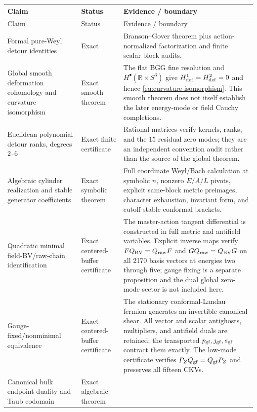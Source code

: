 \documentclass[11pt]{article}
\theoremstyle{definition}
\theoremstyle{remark}
\newcommand{\R}{\mathbb R}
\begin{document}
{\scriptsize
\begin{longtable}{>{\raggedright\arraybackslash}p{}
                >{\raggedright\arraybackslash}p{}
                >{\raggedright\arraybackslash}p{}}
\toprule
Claim & Status & Evidence / boundary\\
\midrule
\endfirsthead
\toprule
Claim & Status & Evidence / boundary\\
\midrule
\endhead
Formal pure-Weyl detour identities & Exact & Branson--Gover theorem plus
action-normalized factorization and finite scalar-block audits.\\
Global smooth deformation cohomology and curvature isomorphism & Exact
smooth theorem & The flat BGG fine resolution and
$H^\bullet(\R\times S^3)$ give $H^1_{\rm def}=H^2_{\rm def}=0$ and hence
\eqref{eq:curvature-isomorphism}.  This smooth theorem does not itself
establish the later energy-mode or field Cauchy completions.\\
Euclidean polynomial detour ranks, degrees $2$--$6$ & Exact finite
certificate & Rational matrices verify kernels, ranks, and the $15$ residual
zero modes; they are an independent convention audit rather than the source
of the global theorem.\\
Algebraic cylinder realization and stable generator coefficients & Exact
symbolic theorem & Full coordinate Weyl/Bach calculation at symbolic $n$,
nonzero $E/A/L$ pivots, explicit same-block metric preimages, character
exhaustion, invariant form, and cutoff-stable conformal brackets.\\
Quadratic minimal field-BV/raw-chain identification & Exact centered-buffer
certificate & The master-action tangent differential is constructed in full
metric and antifield variables.  Explicit inverse maps verify
$FQ_{\rm BV}=Q_{\rm raw}F$ and $GQ_{\rm raw}=Q_{\rm BV}G$ on all 2170 basis
vectors at energies two through five; gauge fixing is a separate proposition
and the dual global zero-mode sector is not included here.\\
Gauge-fixed/nonminimal equivalence & Exact centered-buffer certificate & The
stationary conformal-Landau fermion generates an invertible canonical shear.
All vector and scalar antighosts, multipliers, and antifield duals are retained;
the transported $p_{\rm gf},\jmath_{\rm gf},s_{\rm gf}$ contract them exactly.
The low-mode certificate verifies $P_ZQ_{\rm gf}=Q_{\rm gf}P_Z$ and preserves
all fifteen CKVs.\\
Canonical bulk endpoint duality and Taub codomain & Exact algebraic theorem &

\end{longtable}}
\end{document}

